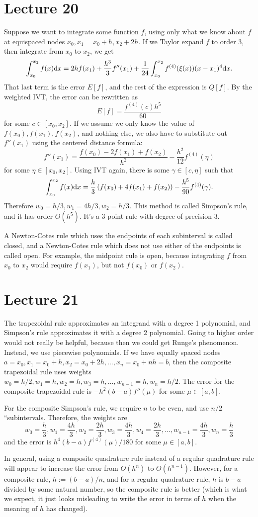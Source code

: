 \documentclass{article}
\begin{document}
\section{Lecture 20}
Suppose we want to integrate some function $f$, using only what we know about $f$ at equispaced nodes $x_0, x_1 = x_0+h, x_2+2h$. If we Taylor expand $f$ to order 3, then integrate from $x_0$ to $x_2$, we get
\[ \int_{x_0}^{x_2} f(x) \mathrm{d} x = 2hf(x_1) + \frac{h^3}{3} f''(x_1) + \frac{1}{24} \int_{x_0}^{x_2} f^{(4)}(\xi(x))(x-x_1)^4 \mathrm{d} x. \]
That last term is the error $E[f]$, and the rest of the expression is $Q[f]$. By the weighted IVT, the error can be rewritten as
\[ E[f] = \frac{f^{(4)}(c)h^5}{60} \]
for some $c \in [x_0, x_2]$. If we assume we only know the value of $f(x_0), f(x_1), f(x_2)$, and nothing else, we also have to substitute out $f''(x_1)$ using the centered distance formula:
\[ f''(x_1) = \frac{f(x_0)-2f(x_1)+f(x_2)}{h^2} - \frac{h^2}{12} f^{(4)}(\eta) \]
for some $\eta \in [x_0, x_2]$. Using IVT again, there is some $\gamma \in [c, \eta]$ such that
\[ \int_{x_0}^{x_2} f(x)\mathrm{d} x = \frac{h}{3} \left( f(x_0) +4f(x_1) +f(x_2) \right) - \frac{h^5}{90} f^{(4)}(\gamma). \]
Therefore $w_0=h/3, w_1=4h/3, w_2=h/3$. This method is called Simpson's rule, and it has order $O(h^5)$. It's a 3-point rule with degree of precision 3.
\par
A Newton-Cotes rule which uses the endpoints of each subinterval is called closed, and a Newton-Cotes rule which does not use either of the endpoints is called open. For example, the midpoint rule is open, because integrating $f$ from $x_0$ to $x_2$ would require $f(x_1)$, but not $f(x_0)$ or $f(x_2)$.

\section{Lecture 21}
The trapezoidal rule approximates an integrand with a degree 1 polynomial, and Simpson's rule approximates it with a degree 2 polynomial. Going to higher order would not really be helpful, because then we could get Runge's phenomenon. Instead, we use piecewise polynomials. If we have equally spaced nodes $a=x_0, x_1 = x_0+h,x_2=x_0+2h, \dots, x_n=x_0+nh=b$, then the composite trapezoidal rule uses weights $w_0= h/2, w_1=h, w_2=h, w_3 = h, \dots, w_{n-1}=h, w_n=h/2$. The error for the composite trapezoidal rule is $-h^2(b-a)f''(\mu)$ for some $\mu \in [a,b]$.
\par
For the composite Simpson's rule, we require $n$ to be even, and use $n/2$ ``subintervals. Therefore, the weights are
\[ w_0 = \frac{h}{3}, w_1 = \frac{4h}{3}, w_2 = \frac{2h}{3}, w_3= \frac{4h}{3}, w_4= \frac{2h}{3}, \dots, w_{n-1}= \frac{4h}{3}, w_n = \frac{h}{3} \]
and the error is $h^4 (b-a) f^{(4)}(\mu) / 180$ for some $\mu \in [a,b]$.
\par
In general, using a composite quadrature rule instead of a regular quadrature rule will appear to increase the error from $O(h^n)$ to $O(h^{n-1})$. However, for a composite rule, $h := (b-a)/n$, and for a regular quadrature rule, $h$ is $b-a$ divided by some natural number, so the composite rule is better (which is what we expect, it just looks misleading to write the error in terms of $h$ when the meaning of $h$ has changed).
\end{document}
